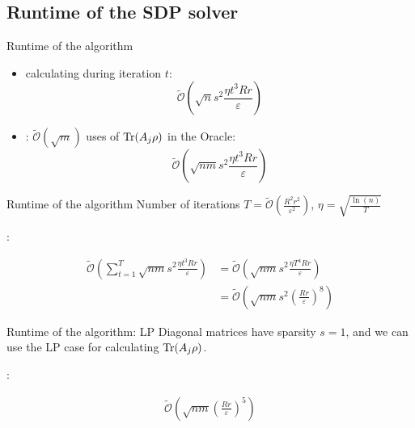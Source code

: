 \subsection{Runtime of the SDP solver}
\begin{frame}{Runtime of the algorithm}
\begin{itemize}
\item calculating  during iteration $t$:
\begin{equation*}
\tilde{\mathcal{O}}\left(\sqrt{n}s^2\frac{\eta t^3 Rr}{\varepsilon}\right)
\end{equation*}
\pause
\item {}: $\tilde{\mathcal{O}}(\sqrt{m})$ uses of $\operatorname{Tr}(A_j\rho)$ in the Oracle:
\begin{equation*}
\tilde{\mathcal{O}}\left(\sqrt{nm}s^2\frac{\eta t^3 Rr}{\varepsilon}\right)
\end{equation*}
\end{itemize}
\end{frame}

\begin{frame}{Runtime of the algorithm}
Number of iterations $T=\tilde{\mathcal{O}}\left(\frac{R^2 r^2}{\varepsilon^2}\right)$, $\eta=\sqrt{\frac{\ln(n)}{T}}$

\vspace{1cm} 

:

\begin{align*}
\tilde{\mathcal{O}}\left(\sum_{t=1}^T \sqrt{nm}s^2\frac{\eta t^3 Rr}{\varepsilon}\right)&=\tilde{\mathcal{O}}\left(\sqrt{nm}s^2\frac{\eta T^4 Rr}{\varepsilon}\right)\\
&=\tilde{\mathcal{O}}\left(\sqrt{nm}s^2\left(\frac{Rr}{\varepsilon}\right)^8\right)
\end{align*}

\end{frame}

\begin{frame}{Runtime of the algorithm: LP}
Diagonal matrices have sparsity $s=1$, and we can use the LP case for calculating $\operatorname{Tr}(A_j\rho)$.

\vspace{1cm} 

:

\begin{align*}
\tilde{\mathcal{O}}\left(\sqrt{nm}\left(\frac{Rr}{\varepsilon}\right)^5\right)
\end{align*}

\end{frame}

